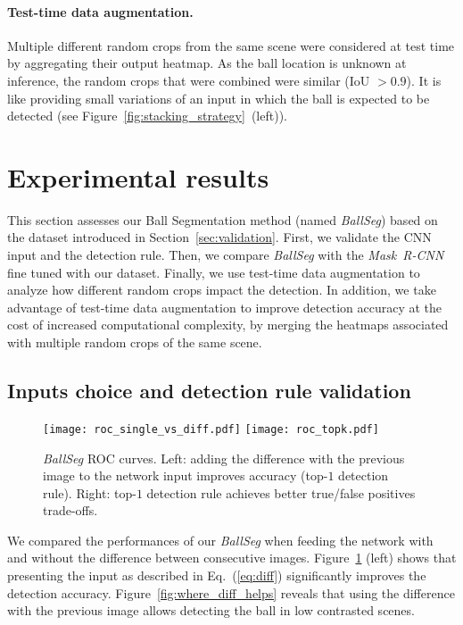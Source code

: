 \documentclass[sigconf, screen]{acmart}
\begin{document}
\paragraph{Test-time data augmentation.}
Multiple different random crops from the same scene were considered at test time by aggregating their output heatmap. As the ball location is unknown at inference, the random crops that were combined were similar (IoU $> 0.9$). It is like providing small variations of an input in which the ball is expected to be detected (see Figure~\ref{fig:stacking_strategy}~(left)).



\section{Experimental results}
\label{sec:results}


This section assesses our Ball Segmentation method (named \emph{BallSeg}) based on the dataset introduced in Section~\ref{sec:validation}.
First, we validate the CNN input and the detection rule.
Then, we compare \emph{BallSeg} with the \emph{Mask~R-CNN} fine tuned with our dataset.
Finally, we use test-time data augmentation to analyze how different random crops impact the detection. In addition, we take advantage of test-time data augmentation to improve detection accuracy at the cost of increased computational complexity, by merging the heatmaps associated with multiple random crops of the same scene.

\subsection{Inputs choice and detection rule validation}

\begin{figure}
    \begin{center}
    \texttt{[image: roc\_single\_vs\_diff.pdf]}\hspace{2em}
    \texttt{[image: roc\_topk.pdf]}
    \end{center}
    \caption{\emph{BallSeg} ROC curves. Left: adding the difference with the previous image to the network input improves accuracy (top-$1$ detection rule). Right: top-$1$ detection rule achieves better true/false positives trade-offs.}
    \label{fig:roc_baseline}
\end{figure}

We compared the performances of our \emph{BallSeg} when feeding the network with and without the difference between consecutive images. Figure~\ref{fig:roc_baseline} (left) shows that presenting the input as described in Eq.~(\ref{eq:diff}) significantly improves the detection accuracy. Figure~\ref{fig:where_diff_helps} reveals that using the difference with the previous image allows detecting the ball in low contrasted scenes.
\end{document}
